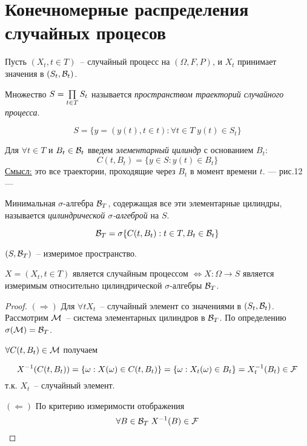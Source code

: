 \section{Конечномерные распределения случайных процесов}
Пусть $(X_t, t \in T)$~-- случайный процесс на $(\Omega, F, P)$, и $X_t$  принимает
значения в $(S_t, \mathcal{B}_t)$.

\begin{definition}
Множество $S = \prod\limits_{t\in T} S_t $ называется \emph{пространством траекторий случайного процесса}.
\end{definition}

$$S = \{y = (y(t), t \in t): \forall t \in T \; y(t) \in S_t\}$$

\begin{definition}
Для $\forall t \in T$ и $B_t \in \mathcal{B}_t$ введем \emph{элементарный цилиндр}
с основанием $B_t$:
$$C(t, B_t) = \{y \in S: y(t) \in B_t\}$$
\underline{Смысл:} это все траектории, проходящие через $B_t$  в момент времени $t$.
--- рис.12 --- \forcenewline
\end{definition}

\begin{definition}
Минимальная $\sigma$-алгебра $\mathcal{B}_T$, содержащая все эти элементарные цилиндры,
называется \emph{цилиндрической $\sigma$-алгеброй} на $S$.

$$\mathcal{B}_T = \sigma\{C(t, B_t): t \in T, B_t \in \mathcal{B}_t\}$$
\end{definition}

$(S, \mathcal{B}_T)$~-- измеримое пространство.

\begin{lem}
$X = (X_t, t \in T)$ является случайным процессом $\Leftrightarrow X: \Omega \to S$
является измеримым относительно цилиндрической $\sigma$-алгебры $\mathcal{B}_T$.
\end{lem}


\begin{proof}

$(\Rightarrow)$ Для $\forall t X_t$~-- случайный элемент со значениями в $(S_t, \mathcal{B}_t)$. Рассмотрим
$\mathcal{M}$~-- система элементарных цилиндров в $\mathcal{B}_T$. По определению $\sigma(\mathcal{M}) = \mathcal{B}_T$.

$\forall C(t, B_t) \in \mathcal{M}$ получаем

$$X^{-1}(C(t, B_t)) = \{\omega:  X(\omega) \in C(t, B_t)\}
= \{\omega: X_t(\omega) \in B_t \} = X_t^{-1}(B_t) \in \mathcal{F}$$
т.к. $X_t$~-- случайный элемент.

$(\Leftarrow)$ По критерию измеримости отображения
$$\forall B \in \mathcal{B}_T \; X^{-1}(B) \in \mathcal{F}$$
\end{proof}

